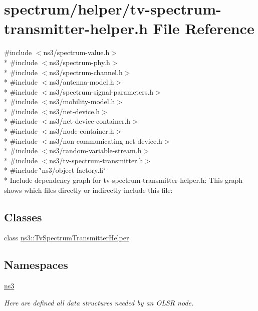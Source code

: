 \hypertarget{tv-spectrum-transmitter-helper_8h}{}\section{spectrum/helper/tv-\/spectrum-\/transmitter-\/helper.h File Reference}
\label{tv-spectrum-transmitter-helper_8h}
{\ttfamily \#include $<$ns3/spectrum-\/value.\+h$>$}\\*
{\ttfamily \#include $<$ns3/spectrum-\/phy.\+h$>$}\\*
{\ttfamily \#include $<$ns3/spectrum-\/channel.\+h$>$}\\*
{\ttfamily \#include $<$ns3/antenna-\/model.\+h$>$}\\*
{\ttfamily \#include $<$ns3/spectrum-\/signal-\/parameters.\+h$>$}\\*
{\ttfamily \#include $<$ns3/mobility-\/model.\+h$>$}\\*
{\ttfamily \#include $<$ns3/net-\/device.\+h$>$}\\*
{\ttfamily \#include $<$ns3/net-\/device-\/container.\+h$>$}\\*
{\ttfamily \#include $<$ns3/node-\/container.\+h$>$}\\*
{\ttfamily \#include $<$ns3/non-\/communicating-\/net-\/device.\+h$>$}\\*
{\ttfamily \#include $<$ns3/random-\/variable-\/stream.\+h$>$}\\*
{\ttfamily \#include $<$ns3/tv-\/spectrum-\/transmitter.\+h$>$}\\*
{\ttfamily \#include \char`\"{}ns3/object-\/factory.\+h\char`\"{}}\\*
Include dependency graph for tv-\/spectrum-\/transmitter-\/helper.h\+:
This graph shows which files directly or indirectly include this file\+:
\subsection*{Classes}
\begin{DoxyCompactItemize}
\item 
class \hyperlink{classns3_1_1TvSpectrumTransmitterHelper}{ns3\+::\+Tv\+Spectrum\+Transmitter\+Helper}
\end{DoxyCompactItemize}
\subsection*{Namespaces}
\begin{DoxyCompactItemize}
\item 
 \hyperlink{namespacens3}{ns3}
\begin{DoxyCompactList}\small\item\em Here are defined all data structures needed by an O\+L\+SR node. \end{DoxyCompactList}\end{DoxyCompactItemize}

